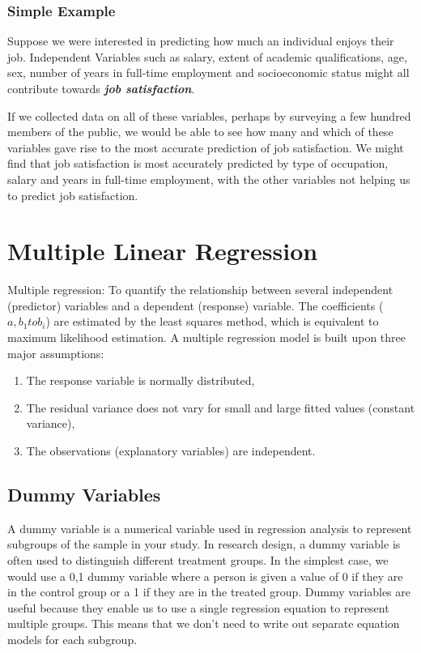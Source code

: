 \documentclass[a4paper,12pt]{article}
\begin{document}
\subsubsection{Simple Example}
Suppose we were interested in predicting how much an individual enjoys their job. Independent Variables such as salary, extent of academic qualifications, age, sex, number of years in full-time employment and socioeconomic status might all contribute towards \textbf{\textit{job satisfaction}}.

If we collected data on all of these variables, perhaps by surveying a few hundred members of the public, we would be able to see how many and which of these variables gave rise to the most accurate prediction of job satisfaction. We might find that job satisfaction is most accurately predicted by type of occupation, salary and years in full-time employment, with the other variables not helping us to predict job satisfaction.


\section{Multiple Linear Regression}
Multiple regression: To quantify the relationship between several independent (predictor) variables and a dependent (response) variable. The coefficients ($a, b_{1} to b_{i}$) are estimated by the least squares method, which is equivalent to maximum likelihood estimation. A multiple regression model is built upon three major assumptions:

\begin{enumerate}
	\item The response variable is normally distributed,
	\item The residual variance does not vary for small and large fitted values (constant variance),
	\item The observations (explanatory variables) are independent.
\end{enumerate}


\subsection{Dummy Variables}
A dummy variable is a numerical variable used in regression analysis to represent subgroups of the sample in your study. In research design, a dummy variable is often used to distinguish different treatment groups. In the simplest case, we would use a 0,1 dummy variable where a person is given a value of 0 if they are in the control group or a 1 if they are in the treated group. Dummy variables are useful because they enable us to use a single regression equation to represent multiple groups. This means that we don't need to write out separate equation models for each subgroup.
\end{document}
